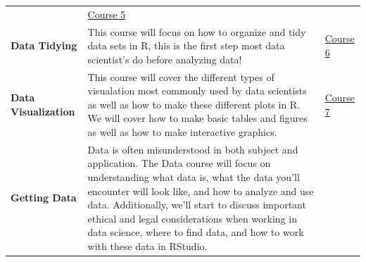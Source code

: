 \documentclass[]{book}
\begin{document}
\begin{longtable}[]{@{}lll@{}}
\begin{minipage}[t]{0.54\columnwidth}
\end{minipage} & \begin{minipage}[t]{0.12\columnwidth}\raggedright
\href{https://leanpub.com/universities/courses/jhu/cbds-intro-r}{Course 5}\strut
\end{minipage}\tabularnewline
\begin{minipage}[t]{0.26\columnwidth}\raggedright
\textbf{Data Tidying}\strut
\end{minipage} & \begin{minipage}[t]{0.54\columnwidth}\raggedright
This course will focus on how to organize and tidy data sets in R, this is the first step most data scientist's do before analyzing data!\strut
\end{minipage} & \begin{minipage}[t]{0.12\columnwidth}\raggedright
\href{https://leanpub.com/universities/courses/jhu/cbds-tidying}{Course 6}\strut
\end{minipage}\tabularnewline
\begin{minipage}[t]{0.26\columnwidth}\raggedright
\textbf{Data Visualization}\strut
\end{minipage} & \begin{minipage}[t]{0.54\columnwidth}\raggedright
This course will cover the different types of visualation most commonly used by data scientists as well as how to make these different plots in R. We will cover how to make basic tables and figures as well as how to make interactive graphics.\strut
\end{minipage} & \begin{minipage}[t]{0.12\columnwidth}\raggedright
\href{https://leanpub.com/universities/courses/jhu/cbds-visualization}{Course 7}\strut
\end{minipage}\tabularnewline
\begin{minipage}[t]{0.26\columnwidth}\raggedright
\textbf{Getting Data}\strut
\end{minipage} & \begin{minipage}[t]{0.54\columnwidth}\raggedright
Data is often misunderstood in both subject and application. The Data course will focus on understanding what data is, what the data you'll encounter will look like, and how to analyze and use data. Additionally, we'll start to discuss important ethical and legal considerations when working in data science, where to find data, and how to work with these data in RStudio.\strut
\end{minipage} & \begin{minipage}[t]{0.12\columnwidth}\raggedright

\end{minipage}
\end{longtable}
\end{document}
